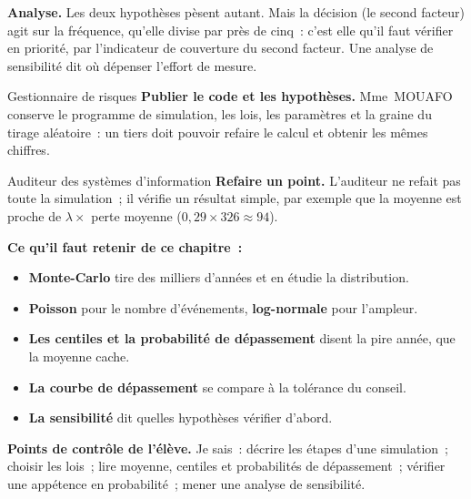 \textbf{Analyse.} Les deux hypothèses pèsent autant. Mais la décision (le
second facteur) agit sur la fréquence, qu'elle divise par près de cinq~:
c'est elle qu'il faut vérifier en priorité, par l'indicateur de
couverture du second facteur. Une analyse de sensibilité dit où dépenser
l'effort de mesure.

\begin{boxmetier}{Gestionnaire de risques}
\textbf{Publier le code et les hypothèses.} Mme~MOUAFO conserve le
programme de simulation, les lois, les paramètres et la graine du tirage
aléatoire~: un tiers doit pouvoir refaire le calcul et obtenir les mêmes
chiffres.
\end{boxmetier}

\begin{boxmetier}{Auditeur des systèmes d'information}
\textbf{Refaire un point.} L'auditeur ne refait pas toute la simulation~;
il vérifie un résultat simple, par exemple que la moyenne est proche de
$\lambda \times$ perte moyenne ($0{,}29 \times 326 \approx 94$).
\end{boxmetier}

\separateur

\begin{boxresume}
\textbf{Ce qu'il faut retenir de ce chapitre~:}
\begin{itemize}
    \item \textbf{Monte-Carlo} tire des milliers d'années et en étudie la
          distribution.
    \item \textbf{Poisson} pour le nombre d'événements, \textbf{log-normale}
          pour l'ampleur.
    \item \textbf{Les centiles et la probabilité de dépassement} disent la
          pire année, que la moyenne cache.
    \item \textbf{La courbe de dépassement} se compare à la tolérance du
          conseil.
    \item \textbf{La sensibilité} dit quelles hypothèses vérifier d'abord.
\end{itemize}
\end{boxresume}

\begin{boxinfo}
\textbf{Points de contrôle de l'élève.} Je sais~: décrire les étapes d'une
simulation~; choisir les lois~; lire moyenne, centiles et probabilités de
dépassement~; vérifier une appétence en probabilité~; mener une analyse de
sensibilité.
\end{boxinfo}

\bigskip

